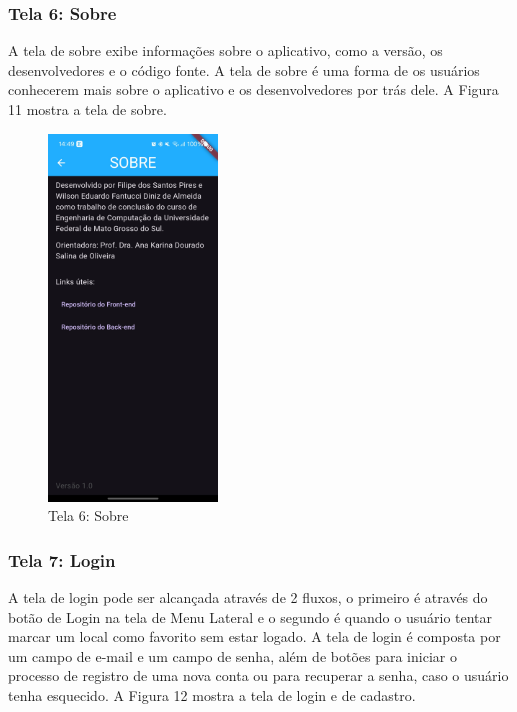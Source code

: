 \subsubsection{Tela 6: Sobre}

    A tela de sobre exibe informações sobre o aplicativo, como a versão, os desenvolvedores e o código fonte. A tela de sobre é uma forma de os usuários conhecerem mais sobre o aplicativo e os desenvolvedores por trás dele. A Figura 11 mostra a tela de sobre.

    \begin{figure}[h]
        \centering
        \includegraphics[width=0.4\textwidth]{imagens/sobre.jpg}
        \caption{\scriptsize Tela 6: Sobre}
        \label{fig:tela6}
    \end{figure}

    \FloatBarrier

\subsubsection{Tela 7: Login}

    A tela de login pode ser alcançada através de 2 fluxos, o primeiro é através do botão de Login na tela de Menu Lateral e o segundo é quando o usuário tentar marcar um local como favorito sem estar logado. A tela de login é composta por um campo de e-mail e um campo de senha, além de botões para iniciar o processo de registro de uma nova conta ou para recuperar a senha, caso o usuário tenha esquecido. A Figura 12 mostra a tela de login e de cadastro.

